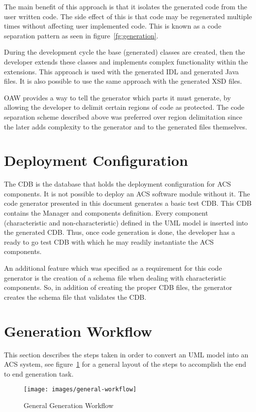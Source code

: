 The main benefit of this approach is that it isolates
the generated code from the user written code.
The side effect of this is that code may be regenerated
multiple times without affecting user implemented code.
This is known as a code separation pattern as
seen in figure~\ref{fg:generation}.

During the development cycle
the base (generated) classes are created,
then the developer extends these classes
and implements complex functionality within the extensions.
This approach is used with the generated IDL
and generated Java files.
It is also possible to use the same
approach with the generated XSD files.

OAW provides a way to tell the generator which
parts it must generate,
by allowing the developer to delimit certain
regions of code as protected.
The code separation scheme described above was preferred over
region delimitation since the later
adds complexity to the generator
and
to the generated files themselves.

\section{Deployment Configuration}
\label{sec:deployment-generation}
The CDB is the database that holds the deployment configuration for ACS components.
It is not possible to deploy an ACS software module without it.
The code generator presented in this document generates a basic test CDB.
This CDB contains the Manager and components definition.
Every component (characteristic and non-characteristic) defined in the UML model is
inserted into the generated CDB. Thus, once code generation is done, the developer has
a ready to go test CDB with which he may readily instantiate the ACS components.

An additional feature which was specified as a requirement for this code generator
is the creation of a schema file when dealing with characteristic components. So, in addition
of creating the proper CDB files, the generator creates the schema file that validates the
CDB.


\section{Generation Workflow}
\label{sec:generation-workflow}
This section describes the steps taken
in order to convert an UML model into an
ACS system,
see figure~\ref{fg:generalWorkflow} for a general layout
of the steps to accomplish
the end to end generation task.
\begin{figure}[htp]
  \begin{center}
  \texttt{[image: images/general-workflow]}
  \end{center}
  \caption{General Generation Workflow}
  \label{fg:generalWorkflow}
\end{figure}

